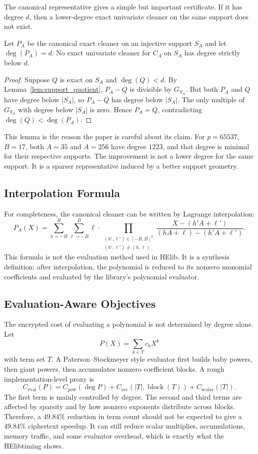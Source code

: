 \documentclass[a4paper,runningheads]{llncs}
\newcommand{\HElib}{\textsf{HElib}}
\begin{document}
The canonical representative gives a simple but important certificate.  If it
has degree $d$, then a lower-degree exact univariate cleaner on the same
support does not exist.

\begin{lemma}
\label{lem:degree_certificate}
Let $P_A$ be the canonical exact cleaner on an injective support $S_A$ and
let $\deg(P_A)=d$.  No exact univariate cleaner for $C_A$ on $S_A$ has degree
strictly below $d$.
\end{lemma}

\begin{proof}
Suppose $Q$ is exact on $S_A$ and $\deg(Q)<d$.  By
Lemma~\ref{lem:support_quotient}, $P_A-Q$ is divisible by $G_{S_A}$.  But
both $P_A$ and $Q$ have degree below $|S_A|$, so $P_A-Q$ has degree below
$|S_A|$.  The only multiple of $G_{S_A}$ with degree below $|S_A|$ is zero.
Hence $P_A=Q$, contradicting $\deg(Q)<\deg(P_A)$.
\end{proof}

This lemma is the reason the paper is careful about its claim.  For
$p=65537$, $B=17$, both $A=35$ and $A=256$ have degree $1223$, and that degree
is minimal for their respective supports.  The improvement is not a lower
degree for the same support.  It is a sparser representative induced by a
better support geometry.

\subsection{Interpolation Formula}

For completeness, the canonical cleaner can be written by Lagrange
interpolation:
\[
  P_A(X)=\sum_{h=-B}^B\sum_{\ell=-B}^B
  \ell\cdot
  \prod_{\substack{(h',\ell')\in[-B,B]^2\\(h',\ell')\ne(h,\ell)}}
  \frac{X-(h'A+\ell')}{(hA+\ell)-(h'A+\ell')}.
\]
This formula is not the evaluation method used in \HElib.  It is a synthesis
definition: after interpolation, the polynomial is reduced to its nonzero
monomial coefficients and evaluated by the library's polynomial evaluator.

\subsection{Evaluation-Aware Objectives}

The encrypted cost of evaluating a polynomial is not determined by degree
alone.  Let
\[
  P(X)=\sum_{k\in T} c_kX^k
\]
with term set $T$.  A Paterson--Stockmeyer style evaluator first builds baby
powers, then giant powers, then accumulates nonzero coefficient blocks.  A
rough implementation-level proxy is
\[
  C_{\mathrm{eval}}(P)
  =
  C_{\mathrm{pow}}(\deg P)
  + C_{\mathrm{acc}}(|T|,\operatorname{block}(T))
  + C_{\mathrm{scalar}}(|T|).
\]
The first term is mainly controlled by degree.  The second and third terms are
affected by sparsity and by how nonzero exponents distribute across blocks.
Therefore, a $49.84\%$ reduction in term count should not be expected to give
a $49.84\%$ ciphertext speedup.  It can still reduce scalar multiplies,
accumulations, memory traffic, and some evaluator overhead, which is exactly
what the \HElib timing shows.
\end{document}
